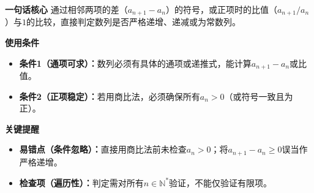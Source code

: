 \begin{summarybox}
	\textbf{\textcolor{CSummary}{一句话核心}}
	通过相邻两项的差（$a_{n+1}-a_n$）的符号，或正项时的比值（$a_{n+1}/a_n$）与$1$的比较，直接判定数列是否严格递增、递减或为常数列。

	\medskip
	\textbf{\textcolor{CSummary}{使用条件}}
	\begin{itemize}[leftmargin=*, itemsep=0.5em, topsep=0.4em]
		\item\textbf{条件1（通项可求）：}数列必须有具体的通项或递推式，能计算$a_{n+1}-a_n$或比值。\item\textbf{条件2（正项稳定）：}若用商比法，必须确保所有$a_n>0$（或符号一致且为正）。
	\end{itemize}

	\medskip
	\textbf{\textcolor{CSummary}{关键提醒}}
	\begin{itemize}[leftmargin=*, itemsep=0.5em, topsep=0.4em]
		\item\textbf{易错点（条件忽略）：}直接用商比法前未检查$a_n>0$；将$a_{n+1}-a_n\ge 0$误当作严格递增。\item\textbf{检查项（遍历性）：}判定需对所有$n\in\mathbb{N}^*$验证，不能仅验证有限项。
	\end{itemize}

\end{summarybox}

